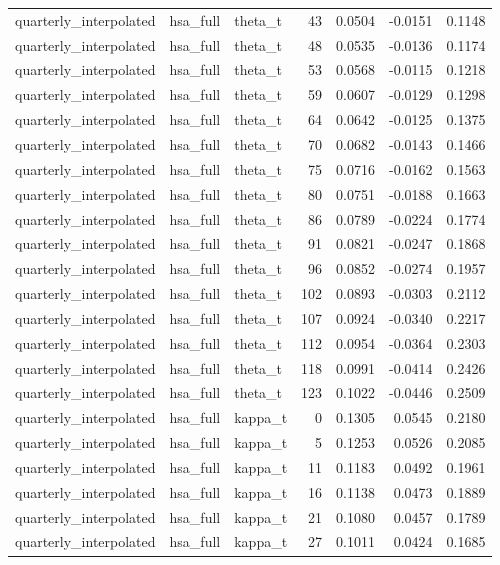 \begin{tabular}{lllrrrr}
quarterly\_interpolated & hsa\_full & theta\_t & 43 & 0.0504 & -0.0151 & 0.1148 \\
quarterly\_interpolated & hsa\_full & theta\_t & 48 & 0.0535 & -0.0136 & 0.1174 \\
quarterly\_interpolated & hsa\_full & theta\_t & 53 & 0.0568 & -0.0115 & 0.1218 \\
quarterly\_interpolated & hsa\_full & theta\_t & 59 & 0.0607 & -0.0129 & 0.1298 \\
quarterly\_interpolated & hsa\_full & theta\_t & 64 & 0.0642 & -0.0125 & 0.1375 \\
quarterly\_interpolated & hsa\_full & theta\_t & 70 & 0.0682 & -0.0143 & 0.1466 \\
quarterly\_interpolated & hsa\_full & theta\_t & 75 & 0.0716 & -0.0162 & 0.1563 \\
quarterly\_interpolated & hsa\_full & theta\_t & 80 & 0.0751 & -0.0188 & 0.1663 \\
quarterly\_interpolated & hsa\_full & theta\_t & 86 & 0.0789 & -0.0224 & 0.1774 \\
quarterly\_interpolated & hsa\_full & theta\_t & 91 & 0.0821 & -0.0247 & 0.1868 \\
quarterly\_interpolated & hsa\_full & theta\_t & 96 & 0.0852 & -0.0274 & 0.1957 \\
quarterly\_interpolated & hsa\_full & theta\_t & 102 & 0.0893 & -0.0303 & 0.2112 \\
quarterly\_interpolated & hsa\_full & theta\_t & 107 & 0.0924 & -0.0340 & 0.2217 \\
quarterly\_interpolated & hsa\_full & theta\_t & 112 & 0.0954 & -0.0364 & 0.2303 \\
quarterly\_interpolated & hsa\_full & theta\_t & 118 & 0.0991 & -0.0414 & 0.2426 \\
quarterly\_interpolated & hsa\_full & theta\_t & 123 & 0.1022 & -0.0446 & 0.2509 \\
quarterly\_interpolated & hsa\_full & kappa\_t & 0 & 0.1305 & 0.0545 & 0.2180 \\
quarterly\_interpolated & hsa\_full & kappa\_t & 5 & 0.1253 & 0.0526 & 0.2085 \\
quarterly\_interpolated & hsa\_full & kappa\_t & 11 & 0.1183 & 0.0492 & 0.1961 \\
quarterly\_interpolated & hsa\_full & kappa\_t & 16 & 0.1138 & 0.0473 & 0.1889 \\
quarterly\_interpolated & hsa\_full & kappa\_t & 21 & 0.1080 & 0.0457 & 0.1789 \\
quarterly\_interpolated & hsa\_full & kappa\_t & 27 & 0.1011 & 0.0424 & 0.1685 \\

\end{tabular}
